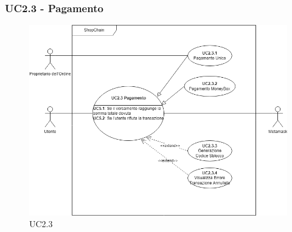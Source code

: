 \subsubsection{UC2.3 - Pagamento}

\begin{figure}[H]
    \centering
    \includegraphics[scale=0.7]{immagini/UC2.3.png}
    \caption{UC2.3}
\end{figure}


